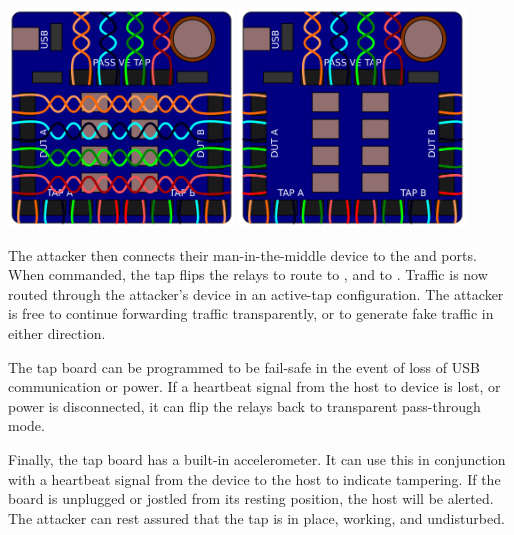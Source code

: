 \documentclass[12pt,notitlepage]{article}
\begin{document}
\begin{center}
    \includegraphics[width=0.45\textwidth]{detour_board_step_1}
    \includegraphics[width=0.45\textwidth]{detour_board_step_2}
\end{center}

The attacker then connects their man-in-the-middle device to the  and  ports. When commanded, the tap flips the relays to route  to , and  to . Traffic is now routed through the attacker's device in an active-tap configuration. The attacker is free to continue forwarding traffic transparently, or to generate fake traffic in either direction.

The tap board can be programmed to be fail-safe in the event of loss of USB communication or power. If a heartbeat signal from the host to device is lost, or power is disconnected, it can flip the relays back to transparent pass-through mode.

Finally, the tap board has a built-in accelerometer. It can use this in conjunction with a heartbeat signal from the device to the host to indicate tampering. If the board is unplugged or jostled from its resting position, the host will be alerted. The attacker can rest assured that the tap is in place, working, and undisturbed.
\end{document}
